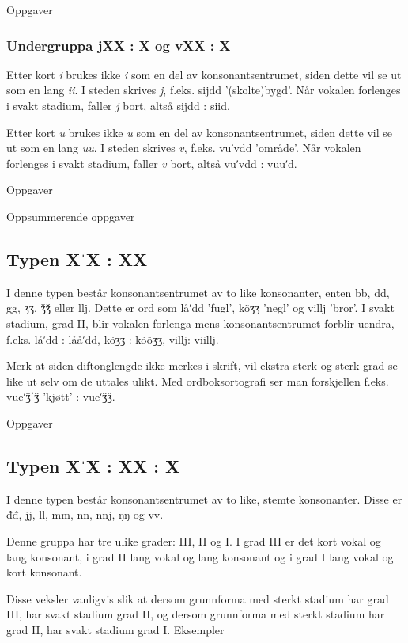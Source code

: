Oppgaver

\subsubsection{Undergruppa jXX : X og vXX : X}

Etter kort \emph{i} brukes ikke \emph{i} som en del av konsonantsentrumet, siden dette vil se ut som en lang \emph{ii}. I steden skrives \emph{j}, f.eks. sijdd '(skolte)bygd'. Når vokalen forlenges i svakt stadium, faller \emph{j} bort, altså sijdd : siid.

Etter kort \emph{u} brukes ikke \emph{u} som en del av konsonantsentrumet, siden dette vil se ut som en lang \emph{uu}. I steden skrives \emph{v}, f.eks. vuʹvdd 'område'. Når vokalen forlenges i svakt stadium, faller \emph{v} bort, altså vuʹvdd : vuuʹd.

Oppgaver

Oppsummerende oppgaver

\subsection{Typen XˈX : XX}

I denne typen består konsonantsentrumet av to like konsonanter, enten bb, dd, gg, ʒʒ, ǯǯ eller llj. Dette er ord som låʹdd 'fugl', kõʒʒ 'negl' og villj 'bror'. I svakt stadium, grad II, blir vokalen forlenga mens konsonantsentrumet forblir uendra, f.eks. låʹdd : lååʹdd, kõʒʒ : kõõʒʒ, villj: viillj.

Merk at siden diftonglengde ikke merkes i skrift, vil ekstra sterk og sterk grad se like ut selv om de uttales ulikt. Med ordboksortografi ser man forskjellen f.eks. vueʹǯˈǯ 'kjøtt' : vueʹǯǯ.

Oppgaver

\subsection{Typen XˈX : XX : X}

I denne typen består konsonantsentrumet av to like, stemte konsonanter. Disse er đđ, jj, ll, mm, nn, nnj, ŋŋ og vv.

Denne gruppa har tre ulike grader: III, II og I. I grad III er det kort vokal og lang konsonant, i grad II lang vokal og lang konsonant og i grad I lang vokal og kort konsonant.

Disse veksler vanligvis slik at dersom grunnforma med sterkt stadium har grad III, har svakt stadium grad II, og dersom grunnforma med sterkt stadium har grad II, har svakt stadium grad I. Eksempler

